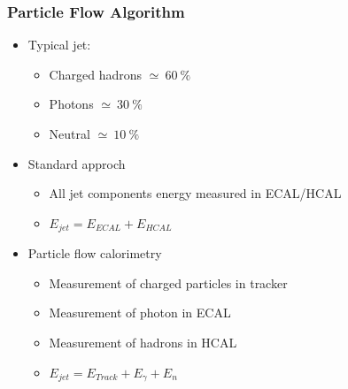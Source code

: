 \documentclass{beamer}
\begin{document}

  \begin{frame}[plain]
    \frametitle{Particle Flow Algorithm}

    \begin{itemize}
      \item Typical jet:
        \begin{itemize}
          \item Charged hadrons $\simeq~60~\%$
          \item Photons $\simeq~30~\%$
          \item Neutral $\simeq~10~\%$
        \end{itemize}
      \item Standard approch
        \begin{itemize}
          \item All jet components energy measured in ECAL/HCAL
          \item $E_{jet} = E_{ECAL} + E_{HCAL}$
        \end{itemize}
      \item Particle flow calorimetry
        \begin{itemize}
          \item Measurement of charged particles in tracker
          \item Measurement of photon in ECAL
          \item Measurement of hadrons in HCAL
          \item $E_{jet} = E_{Track} + E_{\gamma} + E_n$
        \end{itemize}
    \end{itemize}
  \end{frame}

\end{document}
